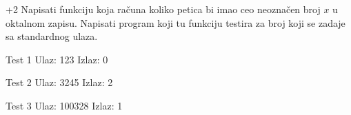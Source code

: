 \begin{Answer}[ref=211]
\end{Answer}

\begin{Exercise}[label=212]\marker+{2}
Napisati funkciju koja računa koliko petica bi imao ceo
  neoznačen broj $x$ u oktalnom zapisu. Napisati program koji
  tu funkciju testira za broj koji se zadaje sa standardnog ulaza.
  
\begin{minitest}
\begin{test}{Test 1}
Ulaz:   123        
Izlaz:  0             
\end{test}
\end{minitest}
\begin{minitest}
\begin{test}{Test 2}
Ulaz:   3245      
Izlaz:  2              
\end{test}
\end{minitest}
\begin{minitest}
\begin{test}{Test 3}
Ulaz:   100328
Izlaz:  1
\end{test}
\end{minitest}  
\end{Exercise}
\begin{Answer}[ref=212]
\end{Answer}
